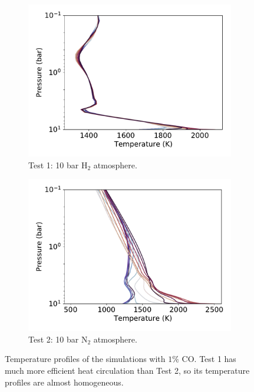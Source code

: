 \begin{figure}
  \centering
  \begin{subfigure}[t]{0.49\textwidth}
    \includegraphics[width=\textwidth]{figures/soc-lava-planets/h2-soc-tp.pdf}
    \caption{Test 1: 10 bar H$_{2}$ atmosphere.}\label{fig:soc-tp-h2}
  \end{subfigure}
  \begin{subfigure}[t]{0.49\textwidth}
    \includegraphics[width=\textwidth]{figures/soc-lava-planets/n2-soc-tp.pdf}
    \caption{Test 2: 10 bar N$_{2}$ atmosphere.}\label{fig:soc-tp-n2}
  \end{subfigure}
  \caption{Temperature profiles of the simulations with $1\%$ CO. Test 1 has much more efficient heat circulation than Test 2, so its temperature profiles are almost homogeneous.}
  \label{fig:soc-tp}
\end{figure}

